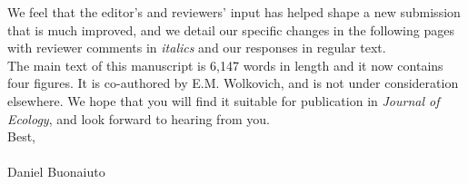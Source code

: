 \documentclass[11 pt]{article}
\begin{document}
\noindent We feel that the editor's and reviewers' input has helped shape a new submission that is much improved, and we detail our specific changes in the following pages with reviewer comments in \emph{italics} and our responses in regular text.\\


\noindent The main text of this manuscript is 6,147 words in length and it now contains four figures. It is co-authored by E.M. Wolkovich, and is not under consideration elsewhere. We hope that you will find it suitable for publication in \textit{Journal of Ecology}, and look forward to hearing from you.\\


\noindent Best,\\\\




\noindent Daniel Buonaiuto
\end{document}
